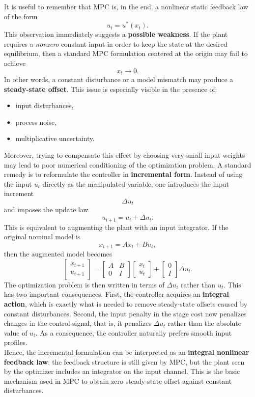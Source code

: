 It is useful to remember that MPC is, in the end, a nonlinear static feedback law of the form
\[
u_t = u^*(x_t).
\]
This observation immediately suggests a \textbf{possible weakness}. If the plant requires a \emph{nonzero} constant input in order to keep the state at the desired equilibrium, then a standard MPC formulation centered at the origin may fail to achieve
\[
x_t \to 0.
\]
In other words, a constant disturbance or a model mismatch may produce a \textbf{steady-state offset}. This issue is especially visible in the presence of:
\begin{itemize}
    \item input disturbances,
    \item process noise,
    \item multiplicative uncertainty.
\end{itemize}
Moreover, trying to compensate this effect by choosing very small input weights may lead to poor numerical conditioning of the optimization problem. A standard remedy is to reformulate the controller in \textbf{incremental form}. Instead of using the input $u_t$ directly as the manipulated variable, one introduces the input increment
\[
\Delta u_t
\]
and imposes the update law
\[
u_{t+1}=u_t+\Delta u_t.
\]
This is equivalent to augmenting the plant with an input integrator. If the original nominal model is
\[
x_{t+1}=Ax_t+Bu_t,
\]
then the augmented model becomes
\[
\begin{bmatrix}
x_{t+1}\\[1mm]
u_{t+1}
\end{bmatrix}
=
\begin{bmatrix}
A & B\\
0 & I
\end{bmatrix}
\begin{bmatrix}
x_t\\[1mm]
u_t
\end{bmatrix}
+
\begin{bmatrix}
0\\
I
\end{bmatrix}
\Delta u_t.
\]
The optimization problem is then written in terms of $\Delta u_t$ rather than $u_t$. This has two important consequences. First, the controller acquires an \textbf{integral action}, which is exactly what is needed to remove steady-state offsets caused by constant disturbances. Second, the input penalty in the stage cost now penalizes changes in the control signal, that is, it penalizes $\Delta u_t$ rather than the absolute value of $u_t$. As a consequence, the controller naturally prefers smooth input profiles.\\
Hence, the incremental formulation can be interpreted as an \textbf{integral nonlinear feedback law}: the feedback structure is still given by MPC, but the plant seen by the optimizer includes an integrator on the input channel. This is the basic mechanism used in MPC to obtain zero steady-state offset against constant disturbances.

